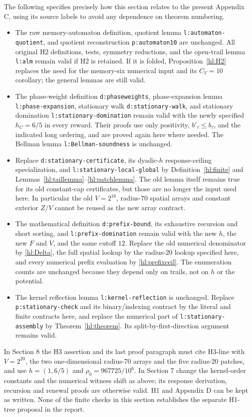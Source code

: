 The following specifies precisely how this section relates to
the present Appendix C, using its source labels to avoid any
dependence on theorem numbering.
\begin{itemize}
\item The raw memory-automaton definition, quotient lemma
\texttt{l:automaton-quotient}, and quotient reconstruction
\texttt{p:automaton10} are unchanged.  All original H2
definitions, tests, symmetry reductions, and the open-trail
lemma \texttt{l:alm} remain valid if H2 is retained.  If it is
folded, Proposition~\ref{hl:H2} replaces the need for the
memory-six numerical input and its $C_V=10$ corollary;
the general lemmas are still valid.
\item The phase-weight definition \texttt{d:phaseweights},
phase-expansion lemma \texttt{l:phase-expansion}, stationary
walk \texttt{d:stationary-walk}, and stationary domination
\texttt{l:stationary-domination} remain valid with the newly
specified $h_C=6/5$ in every reward.  Their proofs use only
positivity, $b'_\tau\le b_\tau$, and the indicated long
ordering, and are proved again here where needed.  The
Bellman lemma \texttt{l:Bellman-soundness} is unchanged.
\item Replace \texttt{d:stationary-certificate}, its
dyadic-$h$ response-ceiling specialization, and
\texttt{l:stationary-local-global} by Definition~\ref{hl:finite}
and Lemmas~\ref{hl:taillemma}--\ref{hl:patchlemma}.
The old lemma itself remains true for its old constant-cap
certificates, but those are no longer the input used here.
In particular the old $V=2^{16}$, radius-70 spatial arrays
and constant exterior $Z/V$ cannot be reused as the new
array contract.
\item The mathematical definition \texttt{d:prefix-bound},
its exhaustive recursion and short sorting, and
\texttt{l:prefix-domination} remain valid with the new $h$,
the new $F$ and $V$, and the same cutoff $12$.
Replace the old numerical denominator by
\eqref{hl:Delta}, the full spatial lookup by the radius-20
lookup specified here, and every numerical prefix
evaluation by \eqref{hl:prefixceil}.  The enumeration counts
are unchanged because they depend only on trails, not on
$h$ or the potential.
\item The kernel reflection lemma
\texttt{l:kernel-\allowbreak reflection} is unchanged.  Replace
\texttt{p:stationary-\allowbreak check} and its binary/indexing contract
by the literal and finite contracts here, and replace the
numerical part of \texttt{l:stationary-\allowbreak assembly} by
Theorem~\ref{hl:theorem}.  Its split-by-first-direction
argument remains valid.
\end{itemize}
In Section 8 the H3 assertion and its last proof paragraph
must cite H3-line with $V=2^{20}$, the two one-dimensional
radius-70 arrays and the five radius-20 patches, and use
$h=(1,6/5)$ and $\rho_0=967725/10^6$.  In Section 7 change
the kernel-order constants and the numerical witness shift
as above; its response derivation, recursion and renewal
proofs are otherwise valid.  H1 and Appendix D can be kept
as written.  None of the finite checks in this section
establishes the separate H1-tree proposal in the report.

